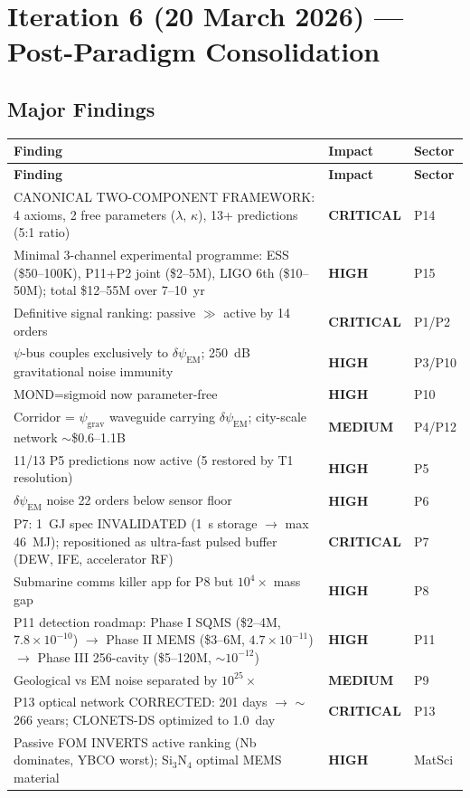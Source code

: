 \documentclass[11pt,a4paper]{article}
\newcommand{\CRITICAL}{\textcolor{critical}{\textbf{CRITICAL}}}
\newcommand{\HIGH}{\textcolor{high}{\textbf{HIGH}}}
\newcommand{\MEDIUM}{\textcolor{medium}{\textbf{MEDIUM}}}
\begin{document}
\section{Iteration 6 (20 March 2026) --- Post-Paradigm Consolidation}

\subsection{Major Findings}

\begin{longtable}{p{}p{}p{}}
\toprule
\textbf{Finding} & \textbf{Impact} & \textbf{Sector} \\
\midrule
\endfirsthead
\midrule
\textbf{Finding} & \textbf{Impact} & \textbf{Sector} \\
\midrule
\endhead
CANONICAL TWO-COMPONENT FRAMEWORK: 4 axioms, 2 free parameters ($\lambda$, $\kappa$), 13+ predictions (5:1 ratio) & \CRITICAL & P14 \\
Minimal 3-channel experimental programme: ESS (\$50--100K), P11+P2 joint (\$2--5M), LIGO 6th (\$10--50M); total \$12--55M over 7--10~yr & \HIGH & P15 \\
Definitive signal ranking: passive $\gg$ active by 14 orders & \CRITICAL & P1/P2 \\
$\psi$-bus couples exclusively to $\delta\psi_\mathrm{EM}$; 250~dB gravitational noise immunity & \HIGH & P3/P10 \\
MOND=sigmoid now parameter-free & \HIGH & P10 \\
Corridor = $\psi_\mathrm{grav}$ waveguide carrying $\delta\psi_\mathrm{EM}$; city-scale network $\sim$\$0.6--1.1B & \MEDIUM & P4/P12 \\
11/13 P5 predictions now active (5 restored by T1 resolution) & \HIGH & P5 \\
$\delta\psi_\mathrm{EM}$ noise 22 orders below sensor floor & \HIGH & P6 \\
P7: 1~GJ spec INVALIDATED (1~s storage $\to$ max 46~MJ); repositioned as ultra-fast pulsed buffer (DEW, IFE, accelerator RF) & \CRITICAL & P7 \\
Submarine comms killer app for P8 but $10^4\times$ mass gap & \HIGH & P8 \\
P11 detection roadmap: Phase I SQMS (\$2--4M, $7.8\times10^{-10}$) $\to$ Phase II MEMS (\$3--6M, $4.7\times10^{-11}$) $\to$ Phase III 256-cavity (\$5--120M, $\sim10^{-12}$) & \HIGH & P11 \\
Geological vs EM noise separated by $10^{25}\times$ & \MEDIUM & P9 \\
P13 optical network CORRECTED: 201 days $\to$ $\sim$266 years; CLONETS-DS optimized to 1.0~day & \CRITICAL & P13 \\
Passive FOM INVERTS active ranking (Nb dominates, YBCO worst); Si$_3$N$_4$ optimal MEMS material & \HIGH & MatSci \\
\bottomrule
\end{longtable}
\end{document}
